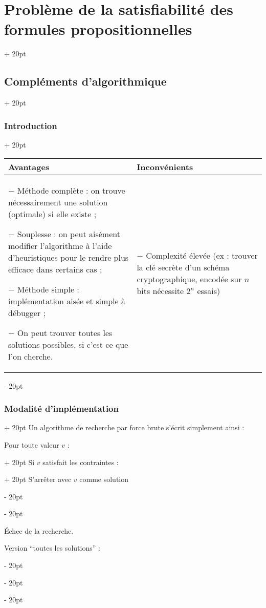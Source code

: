 \documentclass[a4paper, 12pt, twoside]{article}
\newcommand{\ind}[1][20pt]{\advance\leftskip + #1}
\newcommand{\deind}[1][20pt]{\advance\leftskip - #1}
\newenvironment{indt}[2][20pt]{#2 \par \ind[#1]}{\par \deind} %
\begin{document}
\begin{indt}{\section{Problème de la satisfiabilité des formules propositionnelles}}
\begin{indt}{\subsection{Compléments d'algorithmique}}
\begin{indt}{\subsubsection{Introduction}}
                \begin{tabular}{|p{200pt}|p{200pt}|}
                    \hline
                    Avantages & Inconvénients
                    \\
                    \hline
                    $-$ Méthode complète : on trouve nécessairement une solution (optimale) si elle existe ;
                    
                    $-$ Souplesse : on peut aisément modifier l'algorithme à l'aide d'heuristiques pour le rendre plus efficace dans certains cas ;
                    
                    $-$ Méthode simple : implémentation aisée et simple à débugger ;
                    
                    $-$ On peut trouver toutes les solutions possibles, si c'est ce que l'on cherche.
                    & $-$ Complexité élevée (ex : trouver la clé secrète d'un schéma cryptographique, encodée sur $n$ bits nécessite $2^n$ essais)
                    \\
                    \hline
                \end{tabular}
            \end{indt}
            
            \vspace{12pt}
            
            \begin{indt}{\subsubsection{Modalité d'implémentation}}
                Un algorithme de recherche par force brute s'écrit simplement ainsi :
                
                \begin{pseudocode}
                    \begin{indt}{Pour toute valeur $v$ :}
                        \begin{indt}{Si $v$ satisfait les contraintes :}
                            S'arrêter avec $v$ comme solution
                        \end{indt}
                    \end{indt}
                    
                    \'Echec de la recherche.
                \end{pseudocode}
                
                Version ``toutes les solutions'' :
                

\end{indt}
\end{indt}
\end{indt}
\end{document}
